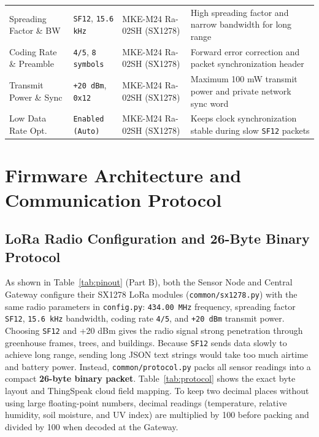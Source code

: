 \documentclass[conference,onecolumn]{IEEEtran}
\begin{document}
\begin{table}[!htbp]
\begin{tabularx}{\textwidth}{L{3.0cm} L{2.4cm} L{3.9cm} Y}
Spreading Factor \& BW & \texttt{SF12}, \texttt{15.6 kHz} & MKE-M24 Ra-02SH (SX1278) & High spreading factor and narrow bandwidth for long range \\
Coding Rate \& Preamble & \texttt{4/5}, \texttt{8 symbols} & MKE-M24 Ra-02SH (SX1278) & Forward error correction and packet synchronization header \\
Transmit Power \& Sync & \texttt{+20 dBm}, \texttt{0x12} & MKE-M24 Ra-02SH (SX1278) & Maximum 100 mW transmit power and private network sync word \\
Low Data Rate Opt. & \texttt{Enabled (Auto)} & MKE-M24 Ra-02SH (SX1278) & Keeps clock synchronization stable during slow \texttt{SF12} packets \\
\bottomrule
\end{tabularx}
\end{table}

\section{Firmware Architecture and Communication Protocol}

\subsection{LoRa Radio Configuration and 26-Byte Binary Protocol}
As shown in Table~\ref{tab:pinout} (Part B), both the Sensor Node and Central Gateway configure their SX1278 LoRa modules (\texttt{common/sx1278.py}) with the same radio parameters in \texttt{config.py}: \texttt{434.00 MHz} frequency, spreading factor \texttt{SF12}, \texttt{15.6 kHz} bandwidth, coding rate \texttt{4/5}, and \texttt{+20 dBm} transmit power. Choosing \texttt{SF12} and +20 dBm gives the radio signal strong penetration through greenhouse frames, trees, and buildings. Because \texttt{SF12} sends data slowly to achieve long range, sending long JSON text strings would take too much airtime and battery power. Instead, \texttt{common/protocol.py} packs all sensor readings into a compact \textbf{26-byte binary packet}. Table~\ref{tab:protocol} shows the exact byte layout and ThingSpeak cloud field mapping. To keep two decimal places without using large floating-point numbers, decimal readings (temperature, relative humidity, soil moisture, and UV index) are multiplied by 100 before packing and divided by 100 when decoded at the Gateway.
\end{document}
